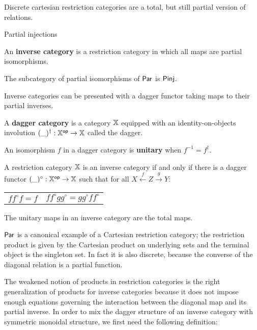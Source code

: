 Discrete cartesian restriction categories are a total, but still partial version of relations.

Partial injections




\begin{definition}\cite[\S 2.3.2]{cockett}
An {\bf inverse category} is a restriction category in which all maps are partial isomorphisms.
\end{definition}

\begin{example}
The subcategory of partial isomorphisms of $\mathsf{Par}$ is  $\mathsf{Pinj}$.
\end{example}

Inverse categories can be presented with a dagger functor taking maps to their partial inverses.

\begin{definition}
\label{def:dag}
A {\bf dagger category} is a category $\mathbb{X}$ equipped with an identity-on-objects involution $(\_)^\dag:\mathbb{X}^{\mathsf{op}}\to\mathbb{X}$ called the dagger.

An isomorphism $f$ in a dagger category is {\bf unitary} when $f^{-1}=f^\dag$.
\end{definition}


\begin{theorem}\cite[Thm. 2.20]{cockett}
A restriction category $\mathbb{X}$ is an inverse category if and only if there is a dagger functor $(\_)^\circ:\mathbb{X}^{\mathsf{op}}\to\mathbb{X}$ such that for all $X\xleftarrow{f} Z \xrightarrow{g} Y$:
\begin{center}
\begin{tabular}{cc}
 $f f^\circ f = f$ & 
 $f f ^\circ gg^\circ = gg^\circ f f ^\circ $
\end{tabular}
\end{center}
\end{theorem}

The unitary maps in an inverse category are the total maps.






$\mathsf{Par}$ is a canonical example of a Cartesian restriction category; the restriction product is given by the Cartesian product on underlying sets and the terminal object is  the singleton set. In fact it is also discrete, because the converse of the diagonal relation is a partial function.




The weakened notion of products in restriction categories is the right generalization of products for inverse categories because it does not impose enough equations governing the interaction between the diagonal map and its partial inverse.  In order to mix the dagger structure of an inverse category with symmetric monoidal structure, we first need the following definition:


